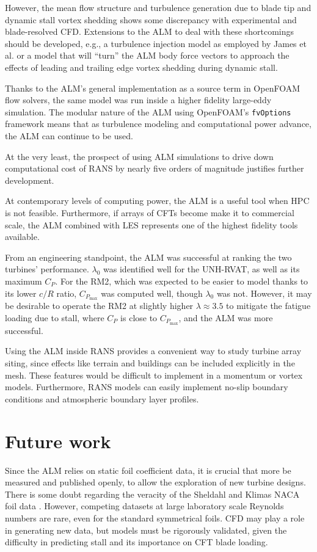 However, the mean flow structure and turbulence generation due to blade tip and
dynamic stall vortex shedding shows some discrepancy with experimental and
blade-resolved CFD. Extensions to the ALM to deal with these shortcomings should
be developed, e.g., a turbulence injection model as employed by James et al.
\cite{James2010} or a model that will ``turn'' the ALM body force vectors to
approach the effects of leading and trailing edge vortex shedding during dynamic
stall.

Thanks to the ALM's general implementation as a source term in OpenFOAM flow
solvers, the same model was run inside a higher fidelity large-eddy simulation.
The modular nature of the ALM using OpenFOAM's \texttt{fvOptions} framework
means that as turbulence modeling and computational power advance, the ALM can
continue to be used.

At the very least, the prospect of using ALM simulations to drive down
computational cost of RANS by nearly five orders of magnitude justifies further
development.

At contemporary levels of computing power, the ALM is a useful tool when HPC is
not feasible. Furthermore, if arrays of CFTs become make it to commercial scale,
the ALM combined with LES represents one of the highest fidelity tools
available.

From an engineering standpoint, the ALM was successful at ranking the two
turbines' performance. $\lambda_0$ was identified well for the UNH-RVAT, as well
as its maximum $C_P$. For the RM2, which was expected to be easier to model
thanks to its lower $c/R$ ratio, $C_{P_{\max}}$ was computed well, though
$\lambda_0$ was not. However, it may be desirable to operate the RM2 at slightly
higher $\lambda \approx 3.5$ to mitigate the fatigue loading due to stall, where
$C_P$ is close to $C_{P_{\max}}$, and the ALM was more successful.

Using the ALM inside RANS provides a convenient way to study turbine array
siting, since effects like terrain and buildings can be included explicitly in
the mesh. These features would be difficult to implement in a momentum or vortex
models. Furthermore, RANS models can easily implement no-slip boundary
conditions and atmospheric boundary layer profiles.


\section{Future work}

Since the ALM relies on static foil coefficient data, it is crucial that more be
measured and published openly, to allow the exploration of new turbine designs.
There is some doubt regarding the veracity of the Sheldahl and Klimas NACA foil
data \cite{Bedon2014}. However, competing datasets at large laboratory scale
Reynolds numbers are rare, even for the standard symmetrical foils. CFD may play
a role in generating new data, but models must be rigorously validated, given
the difficulty in predicting stall and its importance on CFT blade loading.

